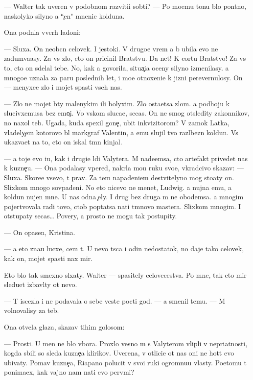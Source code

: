 \documentclass[10pt]{book}
\begin{document}
— Walter tak uveren v podobnom razviti{\y}i sob{\yi}ti{\y}? — Po mo{\y}emu tonu b{\yi}lo pon{\ia}tno, naskolyko silyno {\y}a ``{\c}en{\iu}" mneni{\y}e kolduna.

Ona podn{\ia}la vverh ladoni:

— Sluxa{\y}. On neob{\yi}cn{\yi}{\y} celovek. I jestoki{\y}. V drugo{\y}e vrem{\ia} {\y}a b{\yi} ubila {\y}evo ne zadum{\yi}va{\y}asy. Za vs{\e} zlo, cto on pricinil Bratstvu. Da net! K cortu Bratstvo! Za vs{\e} to, cto on sdelal tebe. No, kak {\y}a govorila, situa{\c}i{\y}a oceny silyno izmenilasy. {\Y}a mnogo{\y}e uznala za paru poslednih let, i mo{\y}e otnoxeni{\y}e k jizni perevernulosy. On — menyxe{\y}e zlo i mojet spasti vseh nas.

— Zlo ne mojet b{\yi}ty malenykim ili bolyxim. Zlo osta{\y}etsa zlom. {\Y}a podhoju k slucivxemusa bez emo{\c}i{\y}. Vo vs{\ia}kom sluca{\y}e, se{\y}cas. On ne smog otsledity zakonnikov, no naxol teb{\ia}. Ugada{\y}, kuda spexil gone{\c}, ubit{\yi}{\y} inkvizitorom? V zamok Latka, vladely{\c}em kotorovo b{\yi}l markgraf Valentin, a {\y}emu slujil tvo{\y} razl{\iu}bezn{\yi}{\y} koldun. Vs{\e} ukaz{\yi}va{\y}et na to, cto on iskal t{\e}mn{\yi}{\y} kinjal.

— {\Y}a toje {\y}evo i{\x}u, kak i drugi{\y}e l{\iu}di Valytera. M{\yi} nade{\y}emsa, cto artefakt privedet nas k kuzne{\c}u. — Ona podalasy vpered, nakr{\yi}la mo{\y}u ruku svo{\y}e{\y}, vkradcivo skazav: — Sluxa{\y}. Skore{\y}e vsevo, t{\yi} prav. Za tem napadeni{\y}em de{\y}stvitelyno mog sto{\y}aty on. Slixkom mnogo sovpadeni{\y}. No eto nicevo ne men{\ia}{\y}et, Ludwig. {\Y}a nujna {\y}emu, a koldun nujen mne. U nas odna {\c}ely. I drug bez druga m{\yi} ne obo{\y}demsa. {\Y}a mnogim pojertvovala radi tovo, ctob{\yi} pop{\yi}tatsa na{\y}ti t{\e}mnovo mastera. Slixkom mnogim. I otstupaty se{\y}cas… Povery, {\y}a prosto ne mogu tak postupity.

— On opasen, Kristina.

— {\Y}a eto zna{\y}u lucxe, cem t{\yi}. U nevo t{\yi}s{\ia}ca i odin nedostatok, no daje tako{\y} celovek, kak on, mojet spasti nax mir.

Eto b{\yi}lo tak smexno sl{\yi}xaty. Walter — spasitely celovecestva. Po mne, tak eto mir sledu{\y}et izbavl{\ia}ty ot nevo.

— T{\yi} iscezla i ne podavala o sebe veste{\y} pocti god. — {\Y}a smenil temu. — M{\yi} volnovalisy za teb{\ia}.

Ona otvela glaza, skazav tihim golosom:

— Prosti. U men{\ia} ne b{\yi}lo v{\yi}bora. Proxlo{\y} vesno{\y} m{\yi} s Valyterom vlipli v nepri{\y}atnosti, kogda sbili so sleda kuzne{\c}a klirikov. Uverena, v otlici{\y}e ot nas oni ne hot{\ia}t {\y}evo ubivaty. Po{\y}mav kuzne{\c}a, Riapano polucit v svo{\y}i ruki ogromnu{\y}u vlasty. Poetomu t{\yi} ponima{\y}ex, kak vajno nam na{\y}ti {\y}evo perv{\yi}mi?
\end{document}
